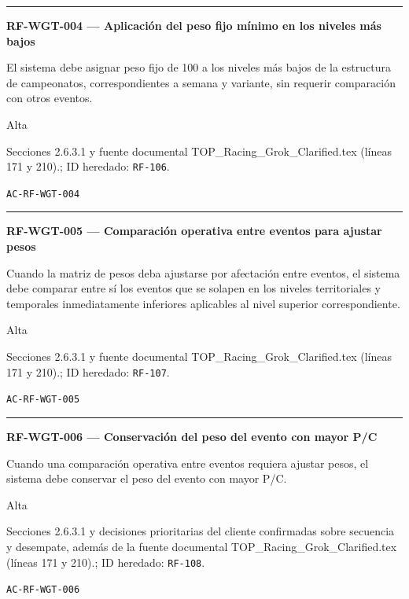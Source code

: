 \documentclass[10pt,letterpaper]{article}
\begin{document}
\vspace{0.25em}\hrule\vspace{0.65em}
\noindent\textbf{RF-WGT-004 --- Aplicación del peso fijo mínimo en los niveles más bajos}\par
\begin{description}[style=nextline,leftmargin=3.15cm,labelwidth=2.8cm,font=\normalfont\bfseries]
\item[Obligación] El sistema debe asignar peso fijo de 100 a los niveles más bajos de la estructura de campeonatos, correspondientes a semana y variante, sin requerir comparación con otros eventos.
\item[Prioridad] Alta
\item[Procedencia] Secciones 2.6.3.1 y fuente documental TOP\_Racing\_Grok\_Clarified.tex (líneas 171 y 210).; ID heredado: \texttt{RF-106}.
\item[Verificación] \texttt{AC-RF-WGT-004}
\end{description}
\vspace{0.25em}\hrule\vspace{0.65em}
\noindent\textbf{RF-WGT-005 --- Comparación operativa entre eventos para ajustar pesos}\par
\begin{description}[style=nextline,leftmargin=3.15cm,labelwidth=2.8cm,font=\normalfont\bfseries]
\item[Obligación] Cuando la matriz de pesos deba ajustarse por afectación entre eventos, el sistema debe comparar entre sí los eventos que se solapen en los niveles territoriales y temporales inmediatamente inferiores aplicables al nivel superior correspondiente.
\item[Prioridad] Alta
\item[Procedencia] Secciones 2.6.3.1 y fuente documental TOP\_Racing\_Grok\_Clarified.tex (líneas 171 y 210).; ID heredado: \texttt{RF-107}.
\item[Verificación] \texttt{AC-RF-WGT-005}
\end{description}
\vspace{0.25em}\hrule\vspace{0.65em}
\noindent\textbf{RF-WGT-006 --- Conservación del peso del evento con mayor P/C}\par
\begin{description}[style=nextline,leftmargin=3.15cm,labelwidth=2.8cm,font=\normalfont\bfseries]
\item[Obligación] Cuando una comparación operativa entre eventos requiera ajustar pesos, el sistema debe conservar el peso del evento con mayor P/C.
\item[Prioridad] Alta
\item[Procedencia] Secciones 2.6.3.1 y decisiones prioritarias del cliente confirmadas sobre secuencia y desempate, además de la fuente documental TOP\_Racing\_Grok\_Clarified.tex (líneas 171 y 210).; ID heredado: \texttt{RF-108}.
\item[Verificación] \texttt{AC-RF-WGT-006}
\end{description}
\end{document}
